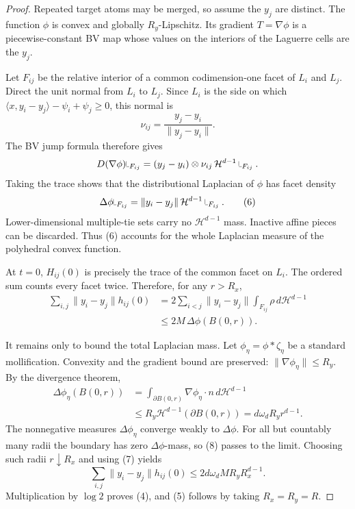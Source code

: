 \documentclass[11pt]{article}
\newcommand{\HH}{\mathcal H}
\newcommand{\dd}{\,d}
\begin{document}
\begin{proof}
Repeated target atoms may be merged, so assume the $y_j$ are distinct.
The function $\phi$ is convex and globally $R_y$-Lipschitz.  Its gradient
$T=\nabla\phi$ is a piecewise-constant BV map whose values on the interiors
of the Laguerre cells are the $y_j$.

Let $F_{ij}$ be the relative interior of a common codimension-one facet of
$L_i$ and $L_j$.  Direct the unit normal from $L_i$ to $L_j$.  Since
$L_i$ is the side on which
\(\langle x,y_i-y_j\rangle-\psi_i+\psi_j\geq0\), this normal is
\[
 \nu_{ij}=\frac{y_j-y_i}{\|y_j-y_i\|}.
\]
The BV jump formula therefore gives
\[
 D(\nabla\phi)\mathbin{\vrule height 1.4ex depth -0.2ex width 0.07ex
 \vrule height 0.07ex depth -0.0ex width 0.7ex}_{F_{ij}}
 =(y_j-y_i)\otimes\nu_{ij}\,
 \HH^{d-1}\mathbin{\vrule height 1.4ex depth -0.2ex width 0.07ex
 \vrule height 0.07ex depth -0.0ex width 0.7ex}_{F_{ij}}.
\]
Taking the trace shows that the distributional Laplacian of $\phi$ has
facet density
\[
 \Delta\phi\mathbin{\vrule height 1.4ex depth -0.2ex width 0.07ex
 \vrule height 0.07ex depth -0.0ex width 0.7ex}_{F_{ij}}
 =\|y_i-y_j\|\,
 \HH^{d-1}\mathbin{\vrule height 1.4ex depth -0.2ex width 0.07ex
 \vrule height 0.07ex depth -0.0ex width 0.7ex}_{F_{ij}}.
 \tag{6}
\]
Lower-dimensional multiple-tie sets carry no $\HH^{d-1}$ mass.  Inactive
affine pieces can be discarded.  Thus (6) accounts for the whole Laplacian
measure of the polyhedral convex function.

At $t=0$, $H_{ij}(0)$ is precisely the trace of the common facet on $L_i$.
The ordered sum counts every facet twice.  Therefore, for any $r>R_x$,
\[
\begin{aligned}
 \sum_{i,j}\|y_i-y_j\|h_{ij}(0)
 &=2\sum_{i<j}\|y_i-y_j\|
   \int_{F_{ij}}\rho\dd\HH^{d-1}\\
 &\leq 2M\,\Delta\phi(B(0,r)).
\end{aligned}
\tag{7}
\]

It remains only to bound the total Laplacian mass.  Let
$\phi_\eta=\phi*\zeta_\eta$ be a standard mollification.  Convexity and the
gradient bound are preserved:
$\|\nabla\phi_\eta\|\leq R_y$.  By the divergence theorem,
\[
\begin{aligned}
 \Delta\phi_\eta(B(0,r))
 &=\int_{\partial B(0,r)}
   \nabla\phi_\eta\cdot n\dd\HH^{d-1}\\
 &\leq R_y\HH^{d-1}(\partial B(0,r))
 =d\omega_dR_y r^{d-1}.
\end{aligned}
\tag{8}
\]
The nonnegative measures $\Delta\phi_\eta$ converge weakly to
$\Delta\phi$.  For all but countably many radii the boundary has zero
$\Delta\phi$-mass, so (8) passes to the limit.  Choosing such radii
$r\downarrow R_x$ and using (7) yields
\[
 \sum_{i,j}\|y_i-y_j\|h_{ij}(0)
 \leq2d\omega_dMR_yR_x^{d-1}.
\]
Multiplication by $\log2$ proves (4), and (5) follows by taking
$R_x=R_y=R$.
\end{proof}
\end{document}
